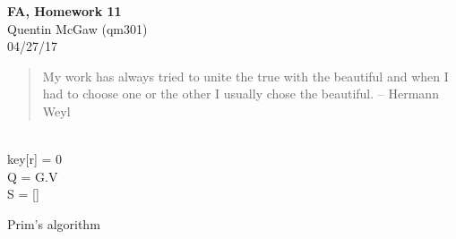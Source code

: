 \documentclass[11pt]{article}
\begin{document}
\begin{center} {\Large\bf FA, Homework 11} \\ Quentin McGaw (qm301) \\ 04/27/17
\end{center}

\begin{quote}
My work has always tried to unite the true with the beautiful and
when I had to choose one or the other I usually chose the beautiful.
--  Hermann Weyl
\end{quote}

\begin{algorithm}[H]
\Indm{} \\
\Indp
    key[r] = 0 \\
    Q = G.V \\
    S = [] \\
\caption{Prim's algorithm}
\end{algorithm}
\end{document}

